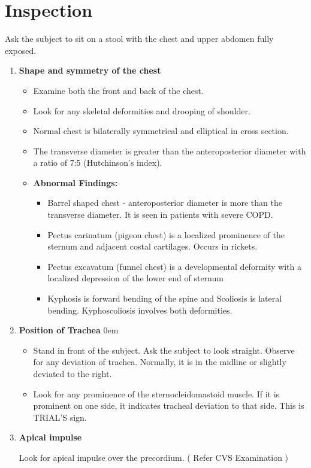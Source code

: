 \documentclass[a4paper,12pt,openany,twoside]{book}
\begin{document}
\section*{Inspection}
Ask the subject to sit on a stool with the chest and upper abdomen fully exposed.
\begin{enumerate}
		\itemsep0em
\item{\textbf{Shape and symmetry of the chest}}
	\begin{itemize}
			\itemsep0em
\item{Examine both the front and back of the chest.}
\item{Look for any skeletal deformities and drooping of shoulder.}
\item{Normal chest is bilaterally symmetrical and elliptical in cross section.}
\item{The transverse diameter is greater than the anteroposterior diameter with a ratio of 7:5  (Hutchinson’s index).}
\item[]\textbf{Abnormal Findings:}
	\begin{itemize}
\item{			Barrel shaped chest - anteroposterior diameter is more than the transverse diameter. It is seen in patients with severe COPD.}
\item{Pectus carinatum (pigeon chest) is a localized prominence of the sternum and adjacent costal cartilages. Occurs in rickets.}
\item{Pectus excavatum (funnel chest) is a developmental deformity with a localized depression of the lower end of sternum}
\item{Kyphosis is forward bending of the spine and Scoliosis is lateral bending. Kyphoscoliosis involves both deformities.}
	\end{itemize}
	\end{itemize}
\item{\textbf{Position of Trachea}}
	\itemsep0em
	\begin{itemize}
\item{Stand in front of the subject. Ask the subject to look straight. Observe for any deviation of trachea. Normally, it is in the midline or slightly deviated to the right.}
\item{Look for any prominence of the sternocleidomastoid muscle. If it is prominent on one side, it indicates tracheal deviation to that side. This is TRIAL’S sign.}
	\end{itemize}
\item{\textbf{Apical impulse}\par Look for apical impulse over the precordium. ( Refer CVS Examination )}

\end{enumerate}
\end{document}
